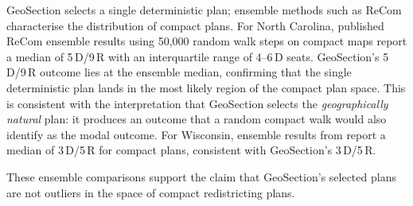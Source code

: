 GeoSection selects a single deterministic plan; ensemble methods such as
ReCom \citep{deford2019} characterise the distribution of compact plans.
For North Carolina, published ReCom ensemble results \citep{duchin2020nc}
using 50,000 random walk steps on compact maps report a median of 5\,D/9\,R
with an interquartile range of 4--6\,D seats.
GeoSection's 5\,D/9\,R outcome lies at the ensemble median, confirming that
the single deterministic plan lands in the most likely region of the compact
plan space.
This is consistent with the interpretation that GeoSection selects the
\emph{geographically natural} plan: it produces an outcome that a random compact
walk would also identify as the modal outcome.
For Wisconsin, ensemble results from \cite{mggg2019wi} report a median of
3\,D/5\,R for compact plans, consistent with GeoSection's 3\,D/5\,R.

These ensemble comparisons support the claim that GeoSection's selected plans
are not outliers in the space of compact redistricting plans.
